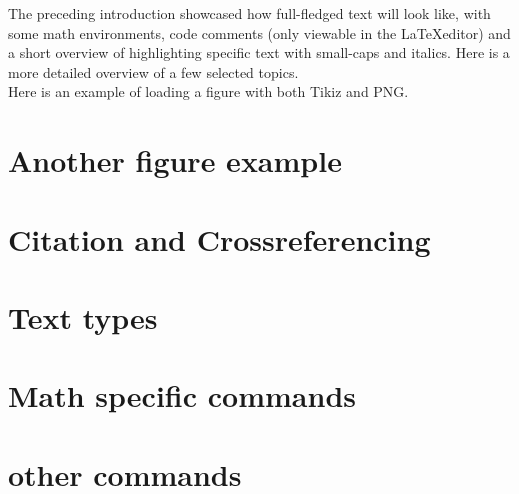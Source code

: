 \documentclass[../thesis.tex]{subfiles}
\begin{document}
The preceding introduction showcased how full-fledged text will look like, with some math environments, code comments (only viewable in the \LaTeX editor) and a short overview of highlighting specific text with small-caps and italics. 
Here is a more detailed overview of a few selected topics.\\

Here is an example of loading a figure with both Tikiz and PNG. 


\section{Another figure example}
    

\section{Citation and Crossreferencing}
    

\section{Text types}
    

\section{Math specific commands}
    

\section{other commands}\label{sec:indicator_zero_set}
    
\end{document}
